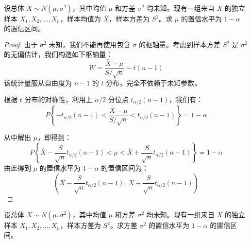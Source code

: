 \documentclass[lang=cn,11pt]{elegantbook}
\begin{document}
\begin{exercise} \label{ex:ci_mu_unknown_var}
设总体 $X\sim N(\mu,\sigma^2)$，其中均值 $\mu$ 和方差 $\sigma^2$ 均未知。现有一组来自 $X$ 的独立样本 $X_1,X_2,\dots,X_n$，样本均值为 $\overline{X}$，样本方差为 $S^2$。求 $\mu$ 的置信水平为 $1-\alpha$ 的置信区间。
\end{exercise}

\begin{proof}
由于 $\sigma^2$ 未知，我们不能再使用包含 $\sigma$ 的枢轴量。考虑到样本方差 $S^2$ 是 $\sigma^2$ 的无偏估计，我们构造如下枢轴量：
\begin{equation*}
W=\frac{\overline{X}-\mu}{S/\sqrt{n}}\sim t(n-1)
\end{equation*}
该统计量服从自由度为 $n-1$ 的 $t$ 分布，完全不依赖于未知参数。

根据 $t$ 分布的对称性，利用上 $\alpha/2$ 分位点 $t_{\alpha/2}(n-1)$，我们有：
\begin{equation*}
P\left\{-t_{\alpha/2}(n-1) < \frac{\overline{X}-\mu}{S/\sqrt{n}} < t_{\alpha/2}(n-1)\right\}=1-\alpha
\end{equation*}

从中解出 $\mu$，即得到：
\begin{equation*}
P\left\{\overline{X}-\frac{S}{\sqrt{n}}t_{\alpha/2}(n-1) < \mu < \overline{X}+\frac{S}{\sqrt{n}}t_{\alpha/2}(n-1)\right\}=1-\alpha
\end{equation*}
由此得到 $\mu$ 的置信水平为 $1-\alpha$ 的置信区间为：
\begin{equation*}
\left(\overline{X}-\frac{S}{\sqrt{n}}t_{\alpha/2}(n-1),\ \overline{X}+\frac{S}{\sqrt{n}}t_{\alpha/2}(n-1)\right)
\end{equation*}
\end{proof}

\begin{exercise} \label{ex:ci_var_unknown_mu}
设总体 $X\sim N(\mu,\sigma^2)$，其中均值 $\mu$ 和方差 $\sigma^2$ 均未知。现有一组来自 $X$ 的独立样本 $X_1,X_2,\dots,X_n$，样本方差为 $S^2$。求方差 $\sigma^2$ 的置信水平为 $1-\alpha$ 的置信区间。
\end{exercise}
\end{document}
